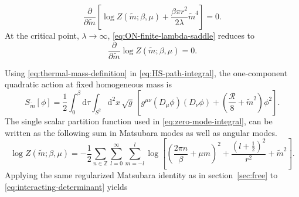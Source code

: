\documentclass[a4paper,11pt]{article}
\newcommand{\secref}[1]{section~\ref{#1}}
\newcommand{\dd}{\mathrm d}
\begin{document}
\begin{equation}
 \frac{\partial}{\partial \tilde m}
 \left[
 \log Z(\tilde m;\beta,\mu)
 +\frac{\beta\pi r^2}{2\lambda}\tilde m^4
 \right]
 =0.
 \label{eq:ON-finite-lambda-saddle}
\end{equation}
At the critical point, $\lambda\to\infty$,
\eqref{eq:ON-finite-lambda-saddle} reduces to
\begin{equation}
 \frac{\partial}{\partial \tilde m}\log Z(\tilde m;\beta,\mu)
 =0.
 \label{eq:critical-saddle-general}
\end{equation}

Using \eqref{eq:thermal-mass-definition} in \eqref{eq:HS-path-integral}, the
one-component quadratic action at fixed homogeneous mass is
\begin{equation}
 S_{\tilde m}[\phi]
 =\frac12\int_0^\beta\dd\tau\int_{S^2}\dd^2x\,\sqrt g\,
 \left[
 g^{\mu\nu}(D_\mu\phi)(D_\nu\phi)
 +\left(\frac{\mathcal R}{8}+\tilde m^2\right)\phi^2
 \right].
 \label{eq:massive-action}
\end{equation}
The single scalar partition function used in \eqref{eq:zero-mode-integral}, can be written as the following sum in Matsubara modes as well as angular modes.
\begin{equation}
 \log Z(\tilde m;\beta,\mu)
 =-\frac12\sum_{n\in\mathbb Z}\sum_{l=0}^{\infty}\sum_{m=-l}^{l}
 \log\!\left[
 \left(\frac{2\pi n}{\beta}+\mu m\right)^2
 +\frac{(l+\tfrac12)^2}{r^2}+\tilde m^2
 \right].
 \label{eq:interacting-determinant}
\end{equation}
Applying the same regularized Matsubara identity as in \secref{sec:free} to
\eqref{eq:interacting-determinant} yields
\end{document}
